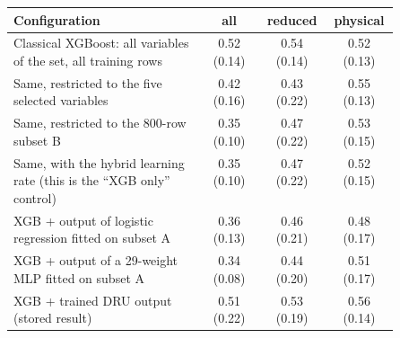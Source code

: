 \begin{tabular}{p{0.5\linewidth}ccc}
\toprule
Configuration & all & reduced & physical \\
\midrule
Classical XGBoost: all variables of the set, all training rows & 0.52 (0.14) & 0.54 (0.14) & 0.52 (0.13) \\
Same, restricted to the five selected variables & 0.42 (0.16) & 0.43 (0.22) & 0.55 (0.13) \\
Same, restricted to the 800-row subset B & 0.35 (0.10) & 0.47 (0.22) & 0.53 (0.15) \\
Same, with the hybrid learning rate (this is the ``XGB only'' control) & 0.35 (0.10) & 0.47 (0.22) & 0.52 (0.15) \\
XGB + output of logistic regression fitted on subset A & 0.36 (0.13) & 0.46 (0.21) & 0.48 (0.17) \\
XGB + output of a 29-weight MLP fitted on subset A & 0.34 (0.08) & 0.44 (0.20) & 0.51 (0.17) \\
XGB + trained DRU output (stored result) & 0.51 (0.22) & 0.53 (0.19) & 0.56 (0.14) \\
\bottomrule
\end{tabular}
